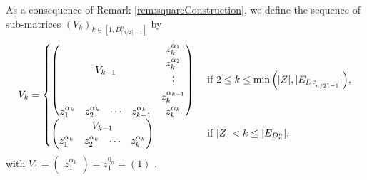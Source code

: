 \documentclass[11pt]{llncs}
\begin{document}
\begin{definition}\label{def:inductiveConstructionOfV}
    As a consequence of Remark \ref{rem:squareConstruction}, we define the sequence of sub-matrices $\left(V_k\right)_{k\in [1,D_{\lceil{n/2}\rceil-1}^n]}$ by
    \begin{align*}
        V_k = 
        \begin{cases}
            \begin{pmatrix}
        \multicolumn{4}{c}{\multirow{4}{*}{$V_{k-1}$}} & z_k^{\alpha_{1}}\\
        & & & & z_k^{\alpha_{2}}\\
        & & & & \vdots\\
        & & & & z_k^{\alpha_{k-1}}\\
        z_1^{\alpha_{k}} & z_{2}^{\alpha_k}& \cdots & z_{k-1}^{\alpha_{k}} & z_{k}^{\alpha_{k}}
    \end{pmatrix} & \mbox{ if } 2\leq k \leq \min{\left(|Z|, |E_{D_{\lceil{n/2}\rceil-1}^n}|\right)},\\
    \begin{pmatrix}
        \multicolumn{4}{c}{\multirow{1}{*}{$V_{k-1}$}} \\
        z_1^{\alpha_k} & z_2^{\alpha_k} & \cdots & z_{k}^{\alpha_k}
    \end{pmatrix} & \mbox{ if } |Z| < k \leq |E_{D_n^n}|,
        \end{cases}
    \end{align*}
    with $V_1 = \begin{pmatrix} z_1^{\alpha_1}\end{pmatrix} = z_1^{0_n} = (1)$ .
\end{definition}
\end{document}
